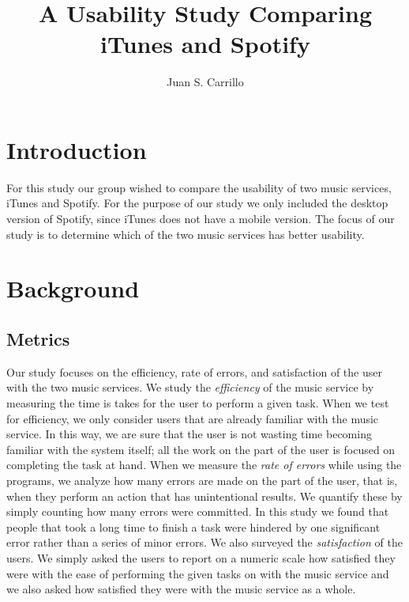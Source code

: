 \documentclass[11pt]{article}
\title{A Usability Study Comparing iTunes and Spotify}
\author{Juan S. Carrillo}
\begin{document}
\maketitle
\section{Introduction}
For this study our group wished to compare the usability of two music services, iTunes and Spotify. For the purpose of our study we only included the desktop version of Spotify, since iTunes does not have a mobile version. The focus of our study is to determine which of the two music services has better usability.
\section{Background}
\subsection{Metrics}
Our study focuses on the efficiency, rate of errors, and satisfaction of the user with the two music services. We study the \textit{efficiency} of the music service by measuring the time is takes for the user to perform a given task. When we test for efficiency, we only consider users that are already familiar with the music service. In this way, we are sure that the user is not wasting time becoming familiar with the system itself; all the work on the part of the user is focused on completing the task at hand. When we measure the \textit{rate of errors} while using the programs, we analyze how many errors are made on the part of the user, that is, when they perform an action that has unintentional results. We quantify these by simply counting how many errors were committed. In this study we found that people that took a long time to finish a task were hindered by one significant error rather than a series of minor errors.  We also surveyed the \textit{satisfaction} of the users. We simply asked the users to report on a numeric scale how satisfied they were with the ease of performing the given tasks on with the music service and we also asked how satisfied they were with the music service as a whole.
\end{document}

